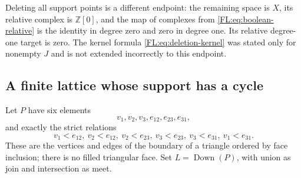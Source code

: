 \documentclass[11pt,a4paper]{article}
\theoremstyle{definition}\newtheorem{definition}[theorem]{Definition}
\providecommand{\Down}{\operatorname{Down}}
\begin{document}
Deleting all support points is a different endpoint: the remaining
space is $X$, its relative complex is $\mathbb Z[0]$, and the map of
complexes from \eqref{FL:eq:boolean-relative} is the identity in degree
zero and zero in degree one. Its relative degree-one target is zero.
The kernel formula \eqref{FL:eq:deletion-kernel} was stated only for
nonempty $J$ and is not extended incorrectly to this endpoint.

\subsection{A finite lattice whose support has a cycle}

Let $P$ have six elements
\[
 v_1,v_2,v_3,e_{12},e_{23},e_{31},
\]
and exactly the strict relations
\[
 v_1<e_{12},\ v_2<e_{12},\ v_2<e_{23},\ v_3<e_{23},\
 v_3<e_{31},\ v_1<e_{31}.
 \tag{FL32}\label{FL:eq:triangle-relations}
\]
These are the vertices and edges of the boundary of a triangle ordered
by face inclusion; there is no filled triangular face. Set
$L=\Down(P)$, with union as join and intersection as meet.
\end{document}
